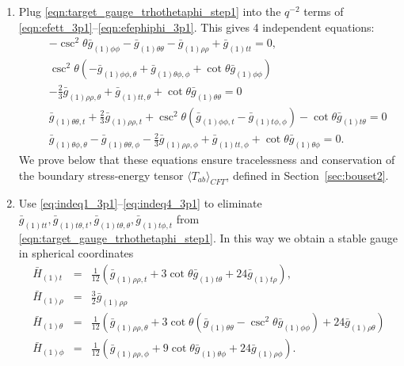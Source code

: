 \documentclass[a4paper,11pt]{article}
\numberwithin{equation}{section}
\begin{document}
\begin{enumerate}
\item Plug \eqref{eqn:target_gauge_trhothetaphi_step1} into the $q^{-2}$ terms of \eqref{eqn:efett_3p1}--\eqref{eqn:efephiphi_3p1}. This gives 4 independent equations:
\begin{eqnarray}
\label{eq:indeq1_3p1}
&&-\csc ^2\theta\bar{g}_{(1) \phi \phi }-\bar{g}_{(1)\theta \theta }-\bar{g}_{(1) \rho \rho }+\bar{g}_{(1) \text{$tt$}}=0,\\
\label{eq:indeq2_3p1}
&&\csc ^2\theta \left(-\bar{g}_{(1) \phi \phi ,\theta }+\bar{g}_{(1)\theta \phi,\phi
   }+\cot \theta  \bar{g}_{(1) \phi \phi }\right)\nonumber\\
   &&-\frac{2}{3} \bar{g}_{(1) \rho \rho
   ,\theta }+\bar{g}_{(1) \text{$tt$},\theta }+\cot \theta  \bar{g}_{(1)\theta \theta}=0\\
   \label{eq:indeq3_3p1}
&&\bar{g}_{(1)\theta \theta,t}+\frac{2}{3} \bar{g}_{(1) \rho \rho ,t}+\csc ^2\theta 
   \left(\bar{g}_{(1) \phi \phi ,t}-\bar{g}_{(1) \text{$t$$\phi $},\phi }\right)-\cot \theta
   \bar{g}_{(1) \text{$t$$\theta $}}=0\\
      \label{eq:indeq4_3p1}
&&\bar{g}_{(1)\theta \phi,\theta }-\bar{g}_{(1)\theta \theta,\phi }-\frac{2}{3} \bar{g}_{(1)
   \rho \rho ,\phi }+\bar{g}_{(1) \text{$tt$},\phi }+\cot \theta \bar{g}_{(1)\theta \phi}=0.
\end{eqnarray}
We prove below that these equations ensure tracelessness and conservation of the boundary stress-energy tensor $\langle T_{ab}\rangle_{CFT}$, defined in Section~\ref{sec:bouset2}.

\item Use \eqref{eq:indeq1_3p1}--\eqref{eq:indeq4_3p1} to eliminate $\bar{g}_{(1)tt},\bar{g}_{(1)t\theta,t},\bar{g}_{(1)t\theta,\theta},\bar{g}_{(1)t\phi,t}$ from \eqref{eqn:target_gauge_trhothetaphi_step1}.
In this way we obtain a stable gauge in spherical coordinates
\begin{eqnarray}\label{eqn:target_gauge_trhothetaphi}
\bar{H}_{(1)t}&=&\frac{1}{12} \left(\bar{g}_{(1) \rho \rho ,t}+3 \cot \theta  \bar{g}_{(1) \text{$t$$\theta
   $}}+24 \bar{g}_{(1) \text{$t$$\rho $}}\right), \nonumber\\
\bar{H}_{(1)\rho}&=&\frac{3}{2} \bar{g}_{(1) \rho \rho }\nonumber\\
\bar{H}_{(1)\theta}&=&\frac{1}{12} \left(\bar{g}_{(1) \rho \rho ,\theta }+3 \cot \theta  \left(\bar{g}_{(1)\theta\theta}-\csc ^2\theta \bar{g}_{(1) \phi \phi }\right)+24 \bar{g}_{(1) \rho \theta }\right)\nonumber\\
\bar{H}_{(1)\phi}&=&\frac{1}{12} \left(\bar{g}_{(1) \rho \rho ,\phi }+9 \cot \theta  \bar{g}_{(1)\theta \phi}+24 \bar{g}_{(1) \rho \phi }\right).
\end{eqnarray}
\end{enumerate}
\end{document}
